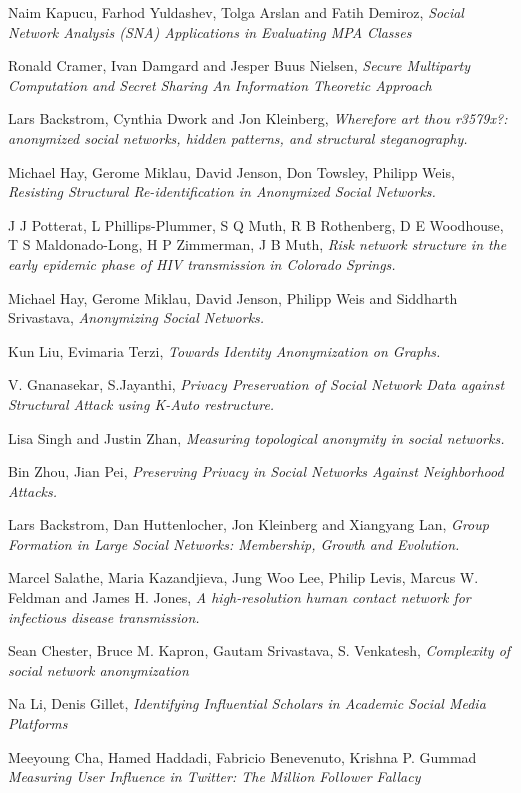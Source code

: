 \documentclass{llncs}
\begin{document}

\begin{thebibliography}{1}

Naim Kapucu, Farhod Yuldashev, Tolga Arslan and Fatih Demiroz, \emph{Social Network Analysis (SNA) Applications in 
Evaluating MPA Classes}

Ronald Cramer, Ivan Damgard and Jesper Buus Nielsen, \emph{Secure Multiparty Computation and Secret Sharing An 
Information Theoretic Approach}

Lars Backstrom, Cynthia Dwork and Jon Kleinberg, \emph{Wherefore art thou r3579x?: anonymized social networks, 
hidden patterns, and structural steganography.}

Michael Hay, Gerome Miklau, David Jenson, Don Towsley, Philipp Weis, \emph{Resisting Structural Re-identification 
in Anonymized Social Networks.}

J J Potterat, L Phillips-Plummer, S Q Muth, R B Rothenberg, D E Woodhouse, T S Maldonado-Long, H P Zimmerman, J B Muth,
\emph{Risk network structure in the early epidemic phase of HIV transmission in Colorado Springs.}

Michael Hay, Gerome Miklau, David Jenson, Philipp Weis and Siddharth Srivastava, \emph{
Anonymizing Social Networks.}

Kun Liu, Evimaria Terzi, \emph{
Towards Identity Anonymization on Graphs.}

V. Gnanasekar, S.Jayanthi, \emph{
Privacy Preservation of Social Network Data against Structural Attack using K-Auto restructure.}

Lisa Singh and Justin Zhan, \emph{
Measuring topological anonymity in social networks.}

Bin Zhou, Jian Pei, \emph{
Preserving Privacy in Social Networks Against Neighborhood Attacks.}

Lars Backstrom, Dan Huttenlocher, Jon Kleinberg and Xiangyang Lan, \emph{
Group Formation in Large Social Networks: Membership, Growth and Evolution.}

Marcel Salathe, Maria Kazandjieva, Jung Woo Lee, Philip Levis, Marcus W. Feldman and James H. Jones, \emph{
A high-resolution human contact network for infectious disease transmission.}

Sean Chester, Bruce M. Kapron, Gautam Srivastava, S. Venkatesh, \emph{Complexity of social network anonymization}

Na Li, Denis Gillet, \emph{Identifying Influential Scholars in Academic Social Media Platforms}

Meeyoung Cha, Hamed Haddadi, Fabricio Benevenuto, Krishna P. Gummad \emph{Measuring User Influence in Twitter: 
The Million Follower Fallacy}

\end{thebibliography}

\end{document}
